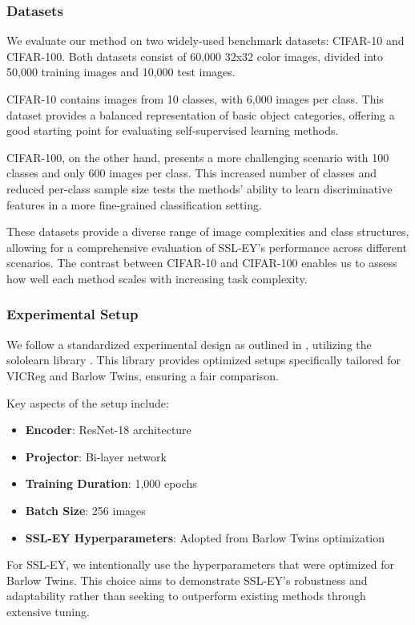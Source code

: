 \subsubsection{Datasets}

We evaluate our method on two widely-used benchmark datasets: CIFAR-10 and CIFAR-100. Both datasets consist of 60,000 32x32 color images, divided into 50,000 training images and 10,000 test images.

CIFAR-10 contains images from 10 classes, with 6,000 images per class. This dataset provides a balanced representation of basic object categories, offering a good starting point for evaluating self-supervised learning methods.

CIFAR-100, on the other hand, presents a more challenging scenario with 100 classes and only 600 images per class. This increased number of classes and reduced per-class sample size tests the methods' ability to learn discriminative features in a more fine-grained classification setting.

These datasets provide a diverse range of image complexities and class structures, allowing for a comprehensive evaluation of SSL-EY's performance across different scenarios. The contrast between CIFAR-10 and CIFAR-100 enables us to assess how well each method scales with increasing task complexity.

\subsubsection{Experimental Setup}
We follow a standardized experimental design as outlined in \citet{tong2023emp}, utilizing the sololearn library \citep{da2022solo}. This library provides optimized setups specifically tailored for VICReg and Barlow Twins, ensuring a fair comparison.

Key aspects of the setup include:
\begin{itemize}
    \item \textbf{Encoder}: ResNet-18 architecture
    \item \textbf{Projector}: Bi-layer network
    \item \textbf{Training Duration}: 1,000 epochs
    \item \textbf{Batch Size}: 256 images
    \item \textbf{SSL-EY Hyperparameters}: Adopted from Barlow Twins optimization
\end{itemize}

For SSL-EY, we intentionally use the hyperparameters that were optimized for Barlow Twins. This choice aims to demonstrate SSL-EY's robustness and adaptability rather than seeking to outperform existing methods through extensive tuning.

